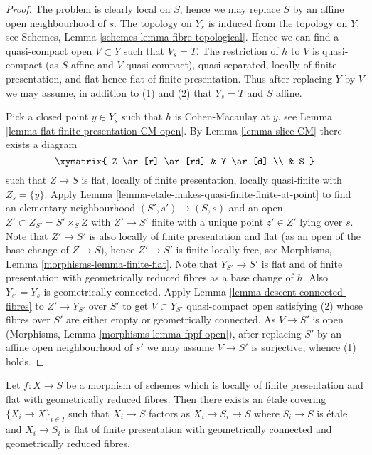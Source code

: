 \begin{proof}
The problem is clearly local on $S$, hence we may replace $S$ by an
affine open neighbourhood of $s$.
The topology on $Y_s$ is induced from the topology on $Y$, see
Schemes, Lemma \ref{schemes-lemma-fibre-topological}.
Hence we can find a quasi-compact open $V \subset Y$ such that $V_s = T$.
The restriction of $h$ to $V$ is quasi-compact (as $S$ affine and $V$
quasi-compact), quasi-separated, locally of finite presentation, and
flat hence flat of finite presentation.
Thus after replacing $Y$ by $V$ we may assume, in addition
to (1) and (2) that $Y_s = T$ and $S$ affine.

\medskip\noindent
Pick a closed point $y \in Y_s$ such that $h$ is Cohen-Macaulay at $y$, see
Lemma \ref{lemma-flat-finite-presentation-CM-open}.
By
Lemma \ref{lemma-slice-CM}
there exists a diagram
$$
\xymatrix{
Z \ar[r] \ar[rd] & Y \ar[d] \\
& S
}
$$
such that $Z \to S$ is flat, locally of finite presentation, locally
quasi-finite with $Z_s = \{y\}$. Apply
Lemma \ref{lemma-etale-makes-quasi-finite-finite-at-point}
to find an elementary neighbourhood $(S', s') \to (S, s)$ and an open
$Z' \subset Z_{S'} = S' \times_S Z$ with $Z' \to S'$ finite with a unique
point $z' \in Z'$ lying over $s$. Note that $Z' \to S'$ is also
locally of finite presentation and flat (as an open of the base change
of $Z \to S$), hence $Z' \to S'$ is finite locally free, see
Morphisms, Lemma \ref{morphisms-lemma-finite-flat}.
Note that $Y_{S'} \to S'$ is flat and of finite presentation
with geometrically reduced fibres as a base change of $h$.
Also $Y_{s'} = Y_s$ is geometrically connected.
Apply Lemma \ref{lemma-descent-connected-fibres}
to $Z' \to Y_{S'}$ over $S'$ to get $V \subset Y_{S'}$ quasi-compact open
satisfying (2) whose fibres over $S'$ are either empty or
geometrically connected. As $V \to S'$ is open
(Morphisms, Lemma \ref{morphisms-lemma-fppf-open}), after replacing
$S'$ by an affine open neighbourhood of $s'$
we may assume $V \to S'$ is surjective, whence (1) holds.
\end{proof}

\begin{lemma}
\label{lemma-cover-by-geometrically-connected}
Let $f : X \to S$ be a morphism of schemes which is
locally of finite presentation and flat with geometrically
reduced fibres. Then there
exists an \'etale covering $\{X_i \to X\}_{i \in I}$
such that $X_i \to S$ factors as $X_i \to S_i \to S$
where $S_i \to S$ is \'etale and $X_i \to S_i$ is
flat of finite presentation with geometrically connected
and geometrically reduced fibres.
\end{lemma}

